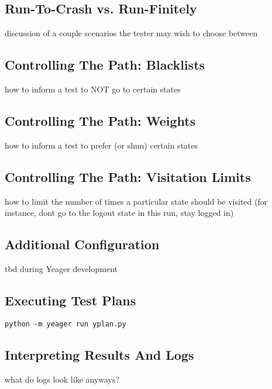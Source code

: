 \subsection{Run-To-Crash vs. Run-Finitely}
discussion of a couple scenarios the tester may wish to choose between %

\subsection{Controlling The Path: Blacklists}
how to inform a test to NOT go to certain states %

\subsection{Controlling The Path: Weights}
how to inform a test to prefer (or shun) certain states %

\subsection{Controlling The Path: Visitation Limits}
how to limit the number of times a particular state should be visited (for instance, dont go to the logout state in this run, stay logged in) %

\subsection{Additional Configuration}
tbd during Yeager development %

\subsection{Executing Test Plans}
\texttt{python -m yeager run yplan.py} %

\subsection{Interpreting Results And Logs}
what do logs look like anyways? %
